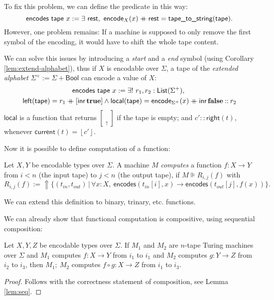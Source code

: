 \documentclass{psartcl}
\newcommand{\MS}[1]{\textsf{#1}}
\newcommand{\cons}{\mathbin{::}}
\newcommand\mdoubleplus{\ensuremath{\mathbin{+\mkern-10mu+}}}
\newcommand{\app}{\mdoubleplus}
\newcommand{\setOf}[1]{\bigl \{ #1 \bigr \}}
\newcommand{\setMap}[2]{\setOf{#1 \,\big|\, #2}}
\newcommand{\from}{:}
\renewcommand{\to}{\rightarrow}
\newcommand{\Bool}{\MS{Bool}}
\newcommand{\List}{\MS{List}}
\newcommand{\Some}[1]{\left\lfloor #1\right\rfloor}
\newcommand{\true}{\mathbf{true}}
\newcommand{\false}{\mathbf{false}}
\newcommand{\tape}[1]{[ #1 ]}
\newcommand{\tapePointer}[1]{\; \underset{\uparrow}{#1} \;}
\newcommand{\niltape}{\tape{\tapePointer{}}}
\DeclareMathOperator{\ignoreParam}{\Uparrow}
\newcommand{\mseq}{;~}
\DeclareMathOperator{\inr}{\ensuremath{\MS{inr}}}
\begin{document}
To fix this problem, we can define the predicate in this way:
$$\MS{encodes}~\MS{tape}~x := \exists~\MS{rest},~\MS{encode}_X(x) \app \MS{rest} = \MS{tape\_to\_string}(\MS{tape}).$$
However, one problem remains:  If a machine is supposed to only remove the first symbol of the encoding, it would have to shift the whole tape
content.

We can solve this issues by introducing a \emph{start} and a \emph{end} symbol (using Corollary \ref{lem:extend-alphabet}), thus if $X$ is
encodable over $\Sigma$, a tape of the \emph{extended alphabet} $\Sigma^+ := \Sigma + \Bool$ can encode a value of $X$:
\begin{multline*}
  \MS{encodes}~\MS{tape}~x:= \exists!~r_1, r_2 : \List(\Sigma^+),~\\
  \MS{left}(\MS{tape}) = r_1 \app [\inr \true] \land
  \MS{local}(\MS{tape}) = \MS{encode}_{\Sigma^+}(x) \app \inr \false \cons r_2
\end{multline*}
$\MS{local}$ is a function that returns $\niltape$ if the tape is empty; and $c' \cons \MS{right}(t)$, whenever $\MS{current}(t) = \Some{c'}$.

Now it is possible to define computation of a function:
\begin{definition}
  \label{def:computes} Let $X, Y$ be encodable types over $\Sigma$.  A machine $M$ \emph{computes} a function $f \from X \to Y$ from $i < n$ (the
  input tape) to $j < n$ (the output tape), if
  $M \VDash R_{i,j}(f)$ with
  $$R_{i,j}(f) :=  \ignoreParam \setMap{(t_{in}, t_{out})}{\forall x:X,~ \MS{encodes}(t_{in}[i], x) \rightarrow \MS{encodes}(t_{out}[j], f(x))}.$$
\end{definition}
We can extend this definition to binary, trinary, etc. functions.

We can already show that functional computation is compositive, using sequential composition:
\begin{lemma}
  \label{lem:computes-composes}
  Let $X, Y, Z$ be encodable types over $\Sigma$.  If $M_1$ and $M_2$ are $n$-tape Turing machines over $\Sigma$ and $M_1$ computes
  $f \from X \to Y$ from $i_1$ to $i_1$ and $M_2$ computes $g \from Y \to Z$ from $i_2$ to $i_3$,
  then $M_1 \mseq M_2$ computes $f \circ g \from X \to Z$ from $i_1$ to $i_3$.
\end{lemma}
\begin{proof}
  Follows with the correctness statement of composition, see Lemma \ref{lem:seq}.
\end{proof}
\end{document}
